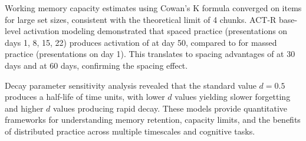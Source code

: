 \documentclass[11pt,a4paper]{article}
\begin{document}
Working memory capacity estimates using Cowan's K formula converged on  items for large set sizes, consistent with the theoretical limit of 4 chunks. ACT-R base-level activation modeling demonstrated that spaced practice (presentations on days 1, 8, 15, 22) produces activation of  at day 50, compared to  for massed practice (presentations on day 1). This translates to spacing advantages of  at 30 days and  at 60 days, confirming the spacing effect.

Decay parameter sensitivity analysis revealed that the standard value $d = 0.5$ produces a half-life of  time units, with lower $d$ values yielding slower forgetting and higher $d$ values producing rapid decay. These models provide quantitative frameworks for understanding memory retention, capacity limits, and the benefits of distributed practice across multiple timescales and cognitive tasks.



\end{document}

